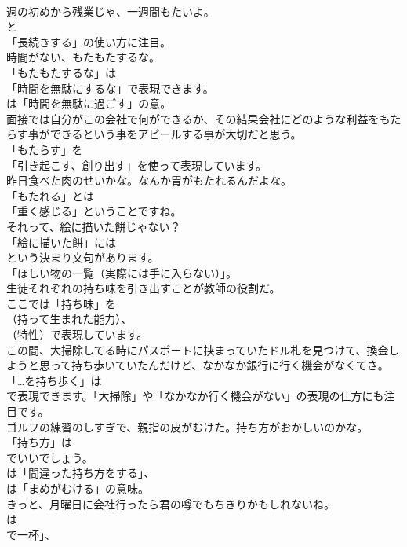 \documentclass[8pt]{extreport}
\begin{document}
\begin{CJK}{UTF8}{min}
\\	週の初めから残業じゃ、一週間もたいよ。 
\\	と
\\	「長続きする」の使い方に注目。	
\\	時間がない、もたもたするな。 
\\	「もたもたするな」は
\\	「時間を無駄にするな」で表現できます。
\\	は「時間を無駄に過ごす」の意。	
\\	面接では自分がこの会社で何ができるか、その結果会社にどのような利益をもたらす事ができるという事をアピールする事が大切だと思う。 
\\	「もたらす」を
\\	「引き起こす、創り出す」を使って表現しています。	
\\	昨日食べた肉のせいかな。なんか胃がもたれるんだよな。 
\\	「もたれる」とは
\\	「重く感じる」ということですね。	
\\	それって、絵に描いた餅じゃない？ 
\\	「絵に描いた餅」には
\\	という決まり文句があります。
\\	「ほしい物の一覧（実際には手に入らない）」。	
\\	生徒それぞれの持ち味を引き出すことが教師の役割だ。 
\\	ここでは「持ち味」を 
\\	（持って生まれた能力）、
\\	（特性）で表現しています。	
\\	この間、大掃除してる時にパスポートに挟まっていたドル札を見つけて、換金しようと思って持ち歩いていたんだけど、なかなか銀行に行く機会がなくてさ。 
\\	「…を持ち歩く」は
\\	で表現できます。「大掃除」や「なかなか行く機会がない」の表現の仕方にも注目です。	
\\	ゴルフの練習のしすぎで、親指の皮がむけた。持ち方がおかしいのかな。 
\\	「持ち方」は 
\\	でいいでしょう。
\\	は「間違った持ち方をする」、
\\	は「まめがむける」の意味。	
\\	きっと、月曜日に会社行ったら君の噂でもちきりかもしれないね。 
\\	は
\\	で一杯」、

\end{CJK}
\end{document}
